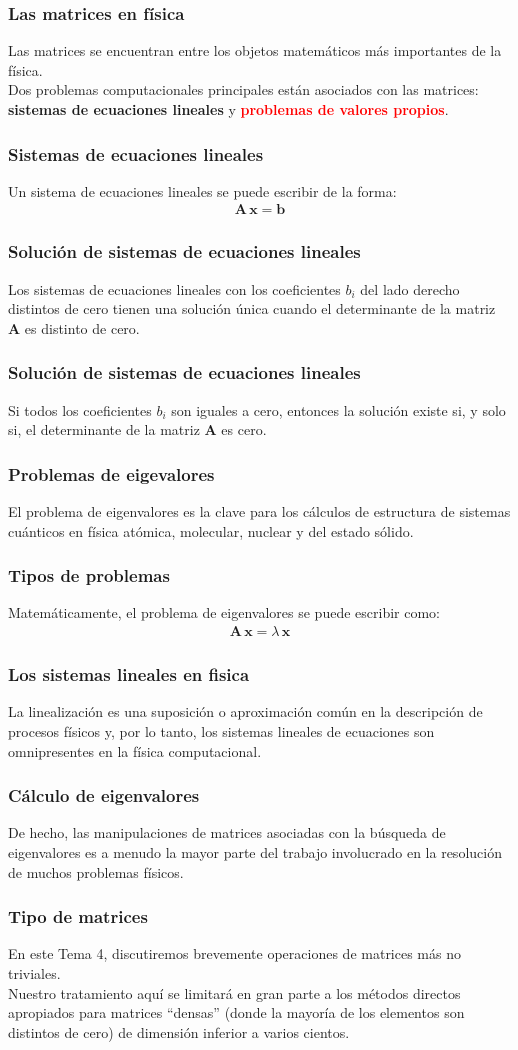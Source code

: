\documentclass[12pt]{beamer}
\begin{document}
\begin{frame}
\frametitle{Las matrices en física}
Las matrices se encuentran entre los objetos matemáticos más importantes de la física.
\\
\bigskip
\pause
Dos problemas computacionales principales están asociados con las matrices: \pause \textbf{\textcolor{ao}{sistemas de ecuaciones lineales}} y \textbf{\textcolor{red}{problemas de valores propios}}.
\end{frame}
\begin{frame}
\frametitle{Sistemas de ecuaciones lineales}
Un sistema de ecuaciones lineales se puede escribir de la forma:
\pause
\begin{align*}
\mathbf{A \, x} = \mathbf{b}
\end{align*}
\end{frame}
\begin{frame}
\frametitle{Solución de sistemas de ecuaciones lineales}
Los sistemas de ecuaciones lineales con los coeficientes $b_{i}$ del lado derecho distintos de cero tienen una solución única cuando el determinante de la matriz $\mathbf{A}$ es distinto de cero.
\end{frame}
\begin{frame}
\frametitle{Solución de sistemas de ecuaciones lineales}
Si todos los coeficientes $b_{i}$ son iguales a cero, entonces la solución existe si, y solo si, el determinante de la matriz $\mathbf{A}$ es cero.
\end{frame}
\begin{frame}
\frametitle{Problemas de eigevalores}
El problema de eigenvalores es la clave para los cálculos de estructura de sistemas cuánticos en física atómica, molecular, nuclear y del estado sólido.
\end{frame}
\begin{frame}
\frametitle{Tipos de problemas}
Matemáticamente, el problema de eigenvalores se puede escribir como:
\pause
\begin{align*}
\mathbf{A \, x} = \lambda \, \mathbf{x}
\end{align*}
\end{frame}
\begin{frame}
\frametitle{Los sistemas lineales en fisica}
La linealización es una suposición o aproximación común en la descripción de procesos físicos y, por lo tanto, los sistemas lineales de ecuaciones son omnipresentes en la física computacional.
\end{frame}
\begin{frame}
\frametitle{Cálculo de eigenvalores}
De hecho, las manipulaciones de matrices asociadas con la búsqueda de eigenvalores es a menudo la mayor parte del trabajo involucrado en la resolución de muchos problemas físicos.
\end{frame}
\begin{frame}
\frametitle{Tipo de matrices}
En este Tema 4, discutiremos brevemente operaciones de matrices más no triviales.
\\
\bigskip
\pause
Nuestro tratamiento aquí se limitará en gran parte a los métodos directos apropiados para matrices \enquote{densas} (donde la mayoría de los elementos son distintos de cero) de dimensión inferior a varios cientos.
\end{frame}
\end{document}
